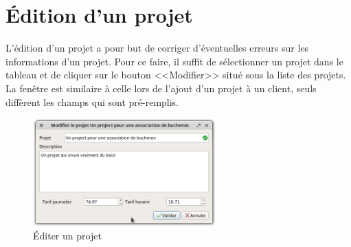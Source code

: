 \section{Édition d'un projet}
L’édition d’un projet a pour but de corriger d’éventuelles erreurs sur les informations d’un projet. Pour ce faire, il suffit de sélectionner un projet dans le tableau et de cliquer sur le bouton <<Modifier>> situé sous la liste des projets. 
La fenêtre est similaire à celle lors de l'ajout d'un projet à un client, seuls diffèrent les champs qui sont pré-remplis. 
\begin{figure}[H]
	\centering
	\includegraphics[width=7cm]{screens/editerProjet.png}
	\caption{Éditer un projet}
\end{figure}